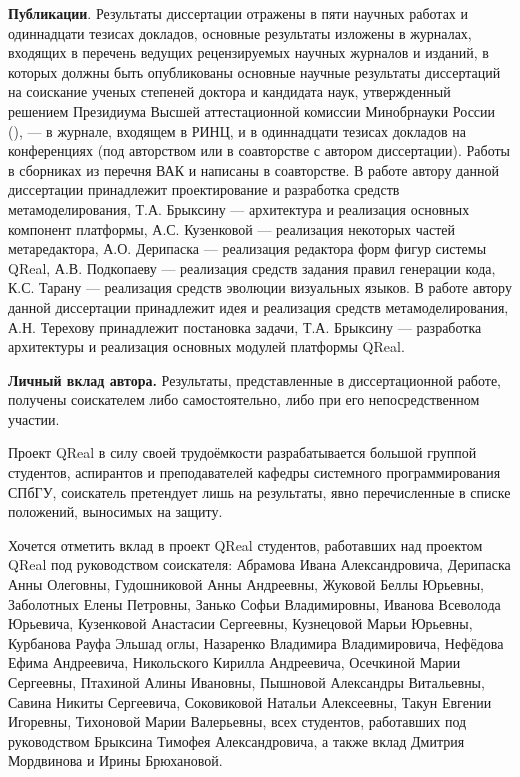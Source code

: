 \textbf{Публикации}. Результаты диссертации отражены в пяти научных работах и одиннадцати тезисах докладов, 
основные результаты изложены в журналах, входящих в перечень ведущих рецензируемых научных 
журналов и изданий, в которых должны быть опубликованы основные научные результаты диссертаций 
на соискание ученых степеней доктора и кандидата наук, утвержденный решением Президиума 
Высшей аттестационной комиссии Минобрнауки России (),
\cite{terekhov2009architecture, osechkina2010gestures} --- в журнале, входящем в РИНЦ, и 
в одиннадцати тезисах докладов на конференциях (под авторством или в соавторстве с автором 
диссертации). Работы в сборниках из перечня ВАК \cite{kuzenkova2011qreal} и \cite{terekhov2013qreal}
написаны в соавторстве. В работе \cite{kuzenkova2011qreal} автору данной диссертации 
принадлежит проектирование и разработка средств метамоделирования, Т.А. Брыксину --- архитектура и реализация основных
компонент платформы, А.С. Кузенковой --- реализация некоторых частей метаредактора, А.О. Дерипаска
--- реализация редактора форм фигур системы QReal, А.В. Подкопаеву --- реализация средств задания правил генерации кода,
К.С. Тарану --- реализация средств эволюции визуальных языков. В работе \cite{terekhov2013qreal}
автору данной диссертации принадлежит идея и реализация средств метамоделирования, А.Н. Терехову 
принадлежит постановка задачи, Т.А. Брыксину --- разработка архитектуры и реализация основных модулей платформы QReal.

\textbf{Личный вклад автора.} Результаты, представленные в диссертационной работе, получены 
соискателем либо самостоятельно, либо при его непосредственном участии.

Проект QReal в силу своей трудоёмкости разрабатывается большой группой студентов, аспирантов
и преподавателей кафедры системного программирования СПбГУ, соискатель претендует лишь на
результаты, явно перечисленные в списке положений, выносимых на защиту.

Хочется отметить вклад в проект QReal студентов, работавших над проектом QReal под руководством 
соискателя: Абрамова Ивана Александровича, Дерипаска Анны Олеговны, Гудошниковой Анны Андреевны, 
Жуковой Беллы Юрьевны, Заболотных Елены Петровны, Занько Софьи Владимировны, Иванова Всеволода Юрьевича, 
Кузенковой Анастасии Сергеевны, Кузнецовой Марьи Юрьевны, Курбанова Рауфа Эльшад оглы, 
Назаренко Владимира Владимировича, Нефёдова Ефима Андреевича, Никольского Кирилла Андреевича, 
Осечкиной Марии Сергеевны, Птахиной Алины Ивановны, Пышновой Александры Витальевны, 
Савина Никиты Сергеевича, Соковиковой Натальи Алексеевны, Такун Евгении Игоревны, 
Тихоновой Марии Валерьевны, всех студентов, работавших под руководством Брыксина Тимофея Александровича, 
а также вклад Дмитрия Мордвинова и Ирины Брюхановой.

